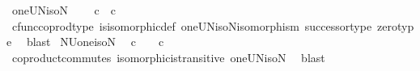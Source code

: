 \begin{isabellebody}
%
\endisadelimproof
%
\isadelimdocument
%
\endisadelimdocument
%
\isatagdocument
%
\isamarkuptrue%
%
\endisatagdocument
{\isafolddocument}%
%
\isadelimdocument
%
\endisadelimdocument
{}\isamarkupfalse%
\ oneUN{\isacharunderscore}{\kern0pt}iso{\isacharunderscore}{\kern0pt}N{\isacharcolon}{\kern0pt}\isanewline
\ \ {\isachardoublequoteopen}{\isasymone}\ {\isasymCoprod}\ {\isasymnat}\isactrlsub c\ {\isasymcong}\ {\isasymnat}\isactrlsub c{\isachardoublequoteclose}\isanewline
%
\isadelimproof
\ \ %
\endisadelimproof
%
\isatagproof
{}\isamarkupfalse%
\ cfunc{\isacharunderscore}{\kern0pt}coprod{\isacharunderscore}{\kern0pt}type\ is{\isacharunderscore}{\kern0pt}isomorphic{\isacharunderscore}{\kern0pt}def\ oneUN{\isacharunderscore}{\kern0pt}iso{\isacharunderscore}{\kern0pt}N{\isacharunderscore}{\kern0pt}isomorphism\ successor{\isacharunderscore}{\kern0pt}type\ zero{\isacharunderscore}{\kern0pt}type\ \isamarkupfalse%
\ blast%
\endisatagproof
{\isafoldproof}%
%
\isadelimproof
\isanewline
%
\endisadelimproof
\isanewline
{}\isamarkupfalse%
\ NUone{\isacharunderscore}{\kern0pt}iso{\isacharunderscore}{\kern0pt}N{\isacharcolon}{\kern0pt}\isanewline
\ \ {\isachardoublequoteopen}{\isasymnat}\isactrlsub c\ {\isasymCoprod}\ {\isasymone}\ {\isasymcong}\ {\isasymnat}\isactrlsub c{\isachardoublequoteclose}\isanewline
%
\isadelimproof
\ \ %
\endisadelimproof
%
\isatagproof
{}\isamarkupfalse%
\ coproduct{\isacharunderscore}{\kern0pt}commutes\ isomorphic{\isacharunderscore}{\kern0pt}is{\isacharunderscore}{\kern0pt}transitive\ oneUN{\isacharunderscore}{\kern0pt}iso{\isacharunderscore}{\kern0pt}N\ \isamarkupfalse%
\ blast%
\endisatagproof
{\isafoldproof}%
%
\isadelimproof
\isanewline
%
\endisadelimproof
%
\isadelimtheory
\ \ \isanewline
%
\endisadelimtheory
%
\isatagtheory
{}\isamarkupfalse%
%
\endisatagtheory
{\isafoldtheory}%
%
\isadelimtheory
%
\endisadelimtheory
%
\end{isabellebody}%
\endinput
